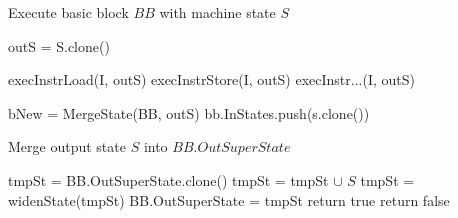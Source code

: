 \begin{algorithm}
  \caption{Execute basic block $BB$ with machine state $S$}
  \footnotesize
  \begin{algorithmic}[1]
    \State outS = S.clone()  

    \State execInstrLoad(I, outS) 
    \EndCase
    \State execInstrStore(I, outS)
    \EndCase
    \State execInstr...(I, outS)
    \EndCase
    \EndSwitch

    \EndFor

    \State
    \State bNew = MergeState(BB, outS) 
     
    \State bb.InStates.push(s.clone())
    \EndFor
    \EndIf

    \EndFunction
  \end{algorithmic}
\end{algorithm}


\begin{algorithm}
  \caption{Merge output state $S$ into $BB.OutSuperState$ }
  \footnotesize
  \begin{algorithmic}[1]
    \State tmpSt = BB.OutSuperState.clone()
    \State tmpSt = tmpSt $\cup$ $S$ 
    \State tmpSt = widenState(tmpSt) 
    \State BB.OutSuperState = tmpSt 
    \State return true 
    \EndIf
    \State return false 
    \EndFunction
  \end{algorithmic}
\end{algorithm}

